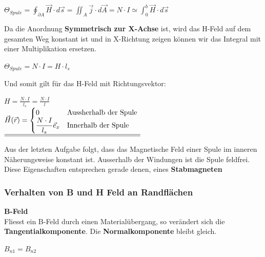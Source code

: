 \begin{center}

	$\displaystyle \Theta_{Spule} = \oint_{\partial A} \vec{H} \cdot d\vec{s} = \iint_{A} \vec{j} \cdot d\vec{A} = N \cdot I \simeq \int_0^b \vec{H} \cdot d\vec{s}$

	\end{center}
	Da die Anordnung \textbf{Symmetrisch zur X-Achse} ist, wird das H-Feld auf dem gesamten Weg konstant ist und in X-Richtung zeigen können wir das Integral mit einer Multiplikation ersetzen.
	\begin{center}

	$ \displaystyle \Theta_{Spule} = N \cdot I = H \cdot l_{s}$

	\end{center}
	Und somit gilt für das H-Feld mit Richtungsvektor:
	\begin{center}

	$\displaystyle H = \frac{N\cdot I}{l_{s}}  = \frac{N\cdot I}{l}$ \\ \fspace
 	$\displaystyle
		\underline{\underline{   \vec{H}(\vec{r}) =
		\begin{cases}
0 & $Aussherhalb der Spule $\\
\displaystyle \frac{N\cdot I}{l_{s}} \vec{e}_x & $Innerhalb der Spule $\\
\end{cases}}}$

	\end{center}
	\iend


	Aus der letzten Aufgabe folgt, dass das Magnetische Feld einer Spule im inneren Näherungsweise konstant ist. Ausserhalb der Windungen ist die Spule feldfrei. \\
	Diese Eigenschaften entsprechen gerade denen, eines \textbf{Stabmagneten}


\subsubsection{Verhalten von B und H Feld an Randflächen}
\fix \fix
\textbf{B-Feld} \\
Fliesst ein B-Feld durch einen Materialübergang, so verändert sich die \textbf{Tangentialkomponente}. Die \textbf{Normalkomponente} bleibt gleich.
\begin{center}
\end{center}
\formulaBegin
$ \displaystyle B_{n1} = B_{n2}$
\\ \fspace

